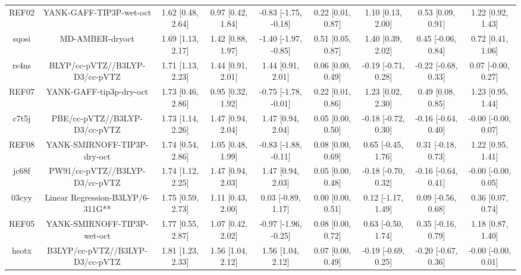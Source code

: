 \documentclass{article}
\begin{document}
\begin{center}
\begin{longtable}{|ccccccccc|}
 REF02 &                            YANK-GAFF-TIP3P-wet-oct &  1.62 [0.48, 2.64] &  0.97 [0.42, 1.84] &  -0.83 [-1.75, -0.18] &  0.22 [0.01, 0.87] &    1.10 [0.13, 2.00] &    0.53 [0.09, 0.91] &     1.22 [0.92, 1.43] \\
 sqosi &                                    MD-AMBER-dryoct &  1.69 [1.13, 2.17] &  1.42 [0.88, 1.97] &  -1.40 [-1.97, -0.85] &  0.51 [0.05, 0.87] &    1.40 [0.39, 2.02] &   0.45 [-0.06, 0.84] &     0.72 [0.41, 1.06] \\
 rs4ns &                     BLYP/cc-pVTZ//B3LYP-D3/cc-pVTZ &  1.71 [1.13, 2.23] &  1.44 [0.91, 2.01] &     1.44 [0.91, 2.01] &  0.06 [0.00, 0.49] &  -0.19 [-0.71, 0.28] &  -0.22 [-0.68, 0.33] &    0.07 [-0.00, 0.27] \\
 REF07 &                            YANK-GAFF-tip3p-dry-oct &  1.73 [0.46, 2.86] &  0.95 [0.32, 1.92] &  -0.75 [-1.78, -0.01] &  0.22 [0.01, 0.86] &    1.23 [0.02, 2.30] &    0.49 [0.08, 0.85] &     1.23 [0.95, 1.44] \\
 c7t5j &                      PBE/cc-pVTZ//B3LYP-D3/cc-pVTZ &  1.73 [1.14, 2.26] &  1.47 [0.94, 2.04] &     1.47 [0.94, 2.04] &  0.05 [0.00, 0.50] &  -0.18 [-0.72, 0.30] &  -0.16 [-0.64, 0.40] &   -0.00 [-0.00, 0.07] \\
 REF08 &                        YANK-SMIRNOFF-TIP3P-dry-oct &  1.74 [0.54, 2.86] &  1.05 [0.48, 1.99] &  -0.83 [-1.88, -0.11] &  0.08 [0.00, 0.69] &   0.65 [-0.45, 1.76] &   0.31 [-0.18, 0.73] &     1.22 [0.95, 1.41] \\
 jc68f &                     PW91/cc-pVTZ//B3LYP-D3/cc-pVTZ &  1.74 [1.12, 2.25] &  1.47 [0.94, 2.03] &     1.47 [0.94, 2.03] &  0.05 [0.00, 0.48] &  -0.18 [-0.70, 0.32] &  -0.16 [-0.64, 0.41] &   -0.00 [-0.00, 0.05] \\
 03cyy &                   Linear Regression-B3LYP/6-311G** &  1.75 [0.59, 2.73] &  1.11 [0.43, 2.00] &    0.03 [-0.89, 1.17] &  0.00 [0.00, 0.51] &   0.12 [-1.17, 1.49] &   0.09 [-0.56, 0.68] &     0.36 [0.07, 0.74] \\
 REF05 &                        YANK-SMIRNOFF-TIP3P-wet-oct &  1.77 [0.55, 2.87] &  1.07 [0.42, 2.02] &  -0.97 [-1.96, -0.25] &  0.08 [0.00, 0.72] &   0.63 [-0.50, 1.74] &   0.35 [-0.16, 0.79] &     1.18 [0.87, 1.40] \\
 hsotx &                    B3LYP/cc-pVTZ//B3LYP-D3/cc-pVTZ &  1.81 [1.23, 2.33] &  1.56 [1.04, 2.12] &     1.56 [1.04, 2.12] &  0.07 [0.00, 0.49] &  -0.19 [-0.69, 0.25] &  -0.20 [-0.67, 0.36] &   -0.00 [-0.00, 0.01] \\

\end{longtable}
\end{center}
\end{document}
